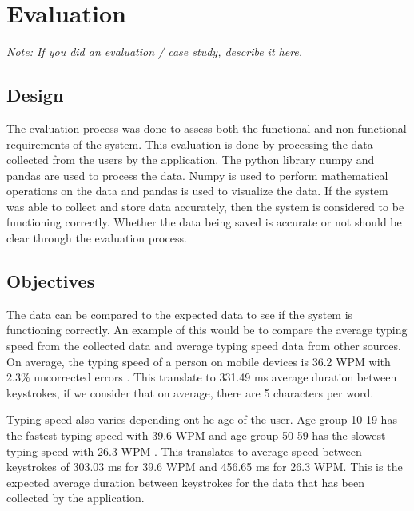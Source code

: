 \chapter{Evaluation}

\textit{Note: If you did an evaluation / case study, describe it here.}

\section{Design}


The evaluation process was done to assess both the functional and non-functional requirements of the system.
This evaluation is done by processing the data collected from the users by the application.
The python library numpy and pandas are used to process the data.
Numpy is used to perform mathematical operations on the data and pandas is used to visualize the data.
If the system was able to collect and store data accurately, then the system is considered to be functioning correctly.
Whether the data being saved is accurate or not should be clear through the evaluation process.

\section{Objectives}


The data can be compared to the expected data to see if the system is functioning correctly.
An example of this would be to compare the average typing speed from the collected data and average typing speed data from other sources.
On average, the typing speed of a person on mobile devices is 36.2 \ac{WPM} with 2.3\% uncorrected errors \cite{Palin2019}.
This translate to 331.49 ms average duration between keystrokes, if we consider that on average, there are 5 characters per word.

Typing speed also varies depending ont he age of the user.
Age group 10-19 has the fastest typing speed with 39.6 \ac{WPM} and age group 50-59 has the slowest typing speed with 26.3 \ac{WPM} \cite{Palin2019}.
This translates to average speed between keystrokes of 303.03 ms for 39.6 \ac{WPM} and 456.65 ms for 26.3 \ac{WPM}.
This is the expected average duration between keystrokes for the data that has been collected by the application.

